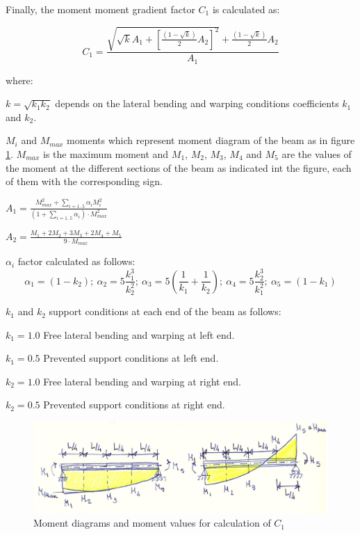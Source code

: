 Finally, the moment moment gradient factor $C_1$ is calculated as:

\begin{equation}
C_1= \frac{\sqrt{\sqrt{k} A_1+[\frac{(1-\sqrt{k})}{2} A_2]^2}+\frac{(1-\sqrt{k})}{2} A_2}{A_1}
\end{equation}

\noindent where:
\begin{description}
\item{$k= \sqrt{k_1 k_2}$} depends on the lateral bending and warping conditions coefficients $k_1$ and $k_2$.
\item{$M_i$ and $M_{max}$} moments which represent moment diagram of the beam as in figure \ref{fg_moment_diagrams}. $M_{max}$ is the maximum moment and $M_1$, $M_2$, $M_3$, $M_4$ and $M_5$ are the values of the moment at the different sections of the beam as indicated int the figure, each of them with the corresponding sign.
\item{$A_1= \frac{M_{max}^2+\sum\limits_{i= 1..5} \alpha_i M_i^2}{(1+\sum\limits_{i= 1..5} \alpha_i) \cdot M_{max}^2}$}
\item{$A_2= \frac{M_1+2 M_2+ 3 M_3 + 2 M_4 + M_5}{9 \cdot M_{max}}$}
\item{$\alpha_i$} factor calculated as follows:
\begin{equation}
\alpha_1= (1-k_2);\ \alpha_2= 5 \frac{k_1^3}{k_2^2};\ \alpha_3= 5 (\frac{1}{k_1}+\frac{1}{k_2});\ \alpha_4= 5 \frac{k_2^3}{k_1^2};\ \alpha_5= (1-k_1)
\end{equation}
\item{$k_1$ and $k_2$} support conditions at each end of the beam as follows:
\begin{description}
\item{$k_1= 1.0$} Free lateral bending and warping at left end.
\item{$k_1= 0.5$} Prevented support conditions at left end.
\item{$k_2= 1.0$} Free lateral bending and warping at right end.
\item{$k_2= 0.5$} Prevented support conditions at right end.
\end{description}
\end{description}

\begin{figure}
\centering
\includegraphics[width=120mm]{materials/figures/ltb_moment_diagrams}
\caption{Moment diagrams and moment values for calculation of $C_1$}\label{fg_moment_diagrams}
\end{figure}

